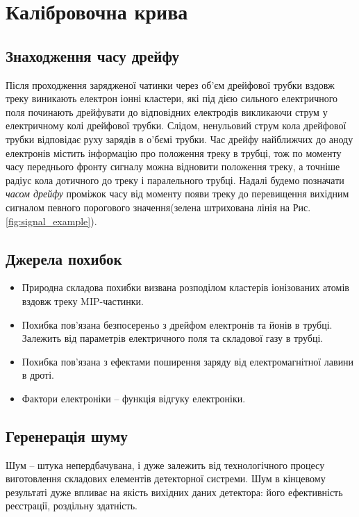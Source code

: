\documentclass[]{article}
\begin{document}
	
	
	\section{Калібровочна крива}
	
	\subsection{Знаходження часу дрейфу}
	Після проходження зарядженої чатинки через об’єм дрейфової трубки вздовж треку виникають електрон іонні кластери, які під дією сильного електричного поля починають дрейфувати до відповідних електродів викликаючи струм у електричному колі дрейфової трубки. Слідом, ненульовий струм кола дрейфової трубки відповідає руху зарядів в о’бємі трубки. Час дрейфу найближчих до аноду електронів містить інформацію про положення треку в трубці, тож по моменту часу переднього фронту сигналу можна відновити положення треку, а точніше радіус кола дотичного до треку і паралельного трубці. Надалі будемо позначати {\it часом дрейфу} проміжок часу від моменту появи треку до перевищення вихідним сигналом певного порогового значення(зелена штрихована лінія на Рис. \ref{fig:signal_example}).
	
	\subsection{Джерела похибок}
	
	\begin{itemize}
		\item Природна складова похибки визвана розподілом кластерів іонізованих атомів вздовж треку MIP-частинки.\par
		\item Похибка пов’язана безпосереньо з дрейфом електронів та йонів в трубці. Залежить від параметрів електричного поля та складової газу в трубці.
		\item Похибка пов’язана з ефектами поширення заряду від електромагнітної лавини в дроті.
		\item Фактори електроніки -- функція відгуку електроніки.
	\end{itemize}
	
	\subsection{Геренерація шуму}
	Шум -- штука непердбачувана, і дуже залежить від технологічного процесу виготовлення складових елементів детекторної систреми. Шум в кінцевому результаті дуже впливає на якість вихідних даних детектора: його ефективність реєстрації, роздільну здатність.
	
\end{document}
